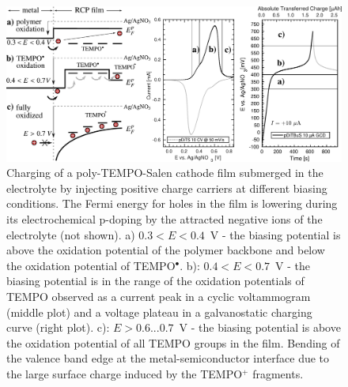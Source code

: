 \begin{figure}[h]
\center
	\includegraphics[width=1\textwidth]{./electrochemistry/figures/transport_in_film.pdf}
	\caption{Charging of a poly-TEMPO-Salen cathode film submerged in the electrolyte by injecting positive charge carriers at different biasing conditions. The Fermi energy for holes in the film is lowering during its electrochemical p-doping by the attracted negative ions of the electrolyte (not shown). a) $0.3<E<0.4$~V - the biasing potential is above the oxidation potential of the polymer backbone and below the oxidation potential of TEMPO$^{\bullet}$. b): $0.4<E<0.7$~V - the biasing potential is in the range of the oxidation potentials of TEMPO observed as a current peak in a cyclic voltammogram (middle plot) and a voltage plateau in a galvanostatic charging curve (right plot). c): $E>0.6...0.7$~V - the biasing potential is above the oxidation potential of all TEMPO groups in the film. Bending of the valence band edge at the metal-semiconductor interface due to the large surface charge induced by the TEMPO$^+$ fragments.}
	\label{fig:biasing_charging}
\end{figure}
